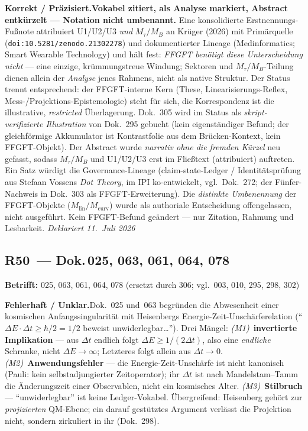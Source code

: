 \smallskip\noindent\textbf{Korrekt / Präzisiert.}\quad \textbf{Vokabel zitiert, als Analyse markiert, Abstract entkürzelt --- Notation nicht umbenannt.} Eine konsolidierte Erstnennungs-Fußnote attribuiert U1/U2/U3 \emph{und} $M_\tau/M_B$ an Krüger (2026) mit Primärquelle (\texttt{doi:10.5281/zenodo.21302278}) und dokumentierter Lineage (Medinformatics; Smart Wearable Technology) und hält fest: \emph{FFGFT benötigt diese Unterscheidung nicht} --- eine einzige, krümmungstreue Windung; Sektoren und $M_\tau/M_B$-Teilung dienen allein der \emph{Analyse} jenes Rahmens, nicht als native Struktur. Der Status trennt entsprechend: der FFGFT-interne Kern (These, Linearisierungs-Reflex, Mess-/Projektions-Epistemologie) steht für sich, die Korrespondenz ist die illustrative, \emph{restricted} Überlagerung. Dok.~305 wird im Status als \emph{skript-verifizierte Illustration} von Dok.~295 gebucht (kein eigenständiger Befund; der gleichförmige Akkumulator ist Kontrastfolie aus dem Brücken-Kontext, kein FFGFT-Objekt). Der Abstract wurde \emph{narrativ ohne die fremden Kürzel} neu gefasst, sodass $M_\tau/M_B$ und U1/U2/U3 erst im Fließtext (attribuiert) auftreten. Ein Satz würdigt die Governance-Lineage (claim-state-Ledger / Identitätsprüfung aus Stefaan Vossens \emph{Dot Theory}, im IPI ko-entwickelt, vgl.\ Dok.~272; der Fünfer-Nachweis in Dok.~303 als FFGFT-Erweiterung). Die \emph{distinkte Umbenennung} der FFGFT-Objekte ($M_{\mathrm{lin}}/M_{\mathrm{curv}}$) wurde als authoriale Entscheidung offengelassen, nicht ausgeführt. Kein FFGFT-Befund geändert --- nur Zitation, Rahmung und Lesbarkeit. \emph{Deklariert 11.~Juli 2026}


\medskip


\subsection*{R50~--- Dok.\,025, 063, 061, 064, 078}

\noindent\textbf{Betrifft:} 025, 063, 061, 064, 078 (ersetzt durch 306; vgl.\ 003, 010, 295, 298, 302)


\smallskip\noindent\textbf{Fehlerhaft / Unklar.}\quad Dok.~025 und~063 begründen die Abwesenheit einer kosmischen Anfangssingularität mit Heisenbergs Energie-Zeit-Unschärferelation (\enquote{$\Delta E\cdot\Delta t \ge \hbar/2 = 1/2$ beweist unwiderlegbar\ldots}). Drei Mängel: \emph{(M1)}~\textbf{invertierte Implikation} --- aus $\Delta t$ endlich folgt $\Delta E \ge 1/(2\Delta t)$, also eine \emph{endliche} Schranke, nicht $\Delta E\to\infty$; Letzteres folgt allein aus $\Delta t\to 0$. \emph{(M2)}~\textbf{Anwendungsfehler} --- die Energie-Zeit-Unschärfe ist nicht kanonisch (Pauli: kein selbstadjungierter Zeitoperator); ihr $\Delta t$ ist nach Mandelstam--Tamm die Änderungszeit einer Observablen, nicht ein kosmisches Alter. \emph{(M3)}~\textbf{Stilbruch} --- \enquote{unwiderlegbar} ist keine Ledger-Vokabel. Übergreifend: Heisenberg gehört zur \emph{projizierten} QM-Ebene; ein darauf gestütztes Argument verlässt die Projektion nicht, sondern zirkuliert in ihr (Dok.~298).


